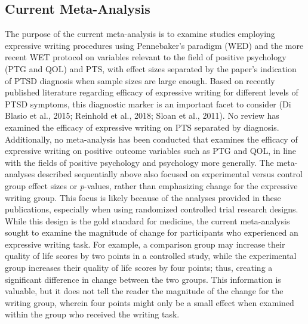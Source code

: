 \documentclass[,man]{apa6}
\begin{document}
\hypertarget{current-meta-analysis}{%
\subsection{Current Meta-Analysis}\label{current-meta-analysis}}

The purpose of the current meta-analysis is to examine studies employing expressive writing procedures using Pennebaker's paradigm (WED) and the more recent WET protocol on variables relevant to the field of positive psychology (PTG and QOL) and PTS, with effect sizes separated by the paper's indication of PTSD diagnosis when sample sizes are large enough. Based on recently published literature regarding efficacy of expressive writing for different levels of PTSD symptoms, this diagnostic marker is an important facet to consider (Di Blasio et al., 2015; Reinhold et al., 2018; Sloan et al., 2011). No review has examined the efficacy of expressive writing on PTS separated by diagnosis. Additionally, no meta-analysis has been conducted that examines the efficacy of expressive writing on positive outcome variables such as PTG and QOL, in line with the fields of positive psychology and psychology more generally. The meta-analyses described sequentially above also focused on experimental versus control group effect sizes or \emph{p}-values, rather than emphasizing change for the expressive writing group. This focus is likely because of the analyses provided in these publications, especially when using randomized controlled trial research designs. While this design is the gold standard for medicine, the current meta-analysis sought to examine the magnitude of change for participants who experienced an expressive writing task. For example, a comparison group may increase their quality of life scores by two points in a controlled study, while the experimental group increases their quality of life scores by four points; thus, creating a significant difference in change between the two groups. This information is valuable, but it does not tell the reader the magnitude of the change for the writing group, wherein four points might only be a small effect when examined within the group who received the writing task.
\end{document}
